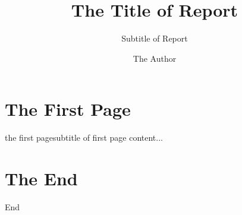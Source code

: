 \documentclass[t]{beamer}
\title{The Title of Report}
\subtitle{Subtitle of Report}
\institute{Xi'an Jiaotong University \\ \ \ \ \  School of Software Engineering }
\author{The Author}
\begin{document}
	\frame{\titlepage}
	\section[Outline]{}
	\frame{\tableofcontents}
	
	\section{The First Page}
	\begin{frame}{the first page}{subtitle of first page}
		 \vspace{-20pt}%
		content...
	\end{frame}

\section{The End}
\begin{frame}[c]{End}
			 \vspace{-20pt}%
\end{frame}
\end{document}
